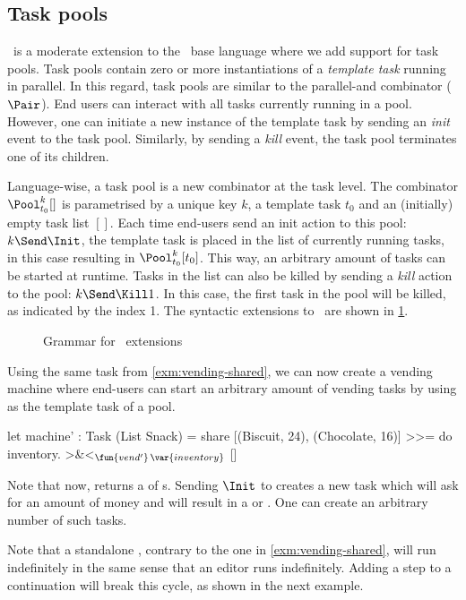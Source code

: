 \subsection{Task pools}

\DYNTOPHAT\ is a moderate extension to the \TOPHAT\ base language where we add support for task pools.
Task pools contain zero or more instantiations of a \emph{template task} running in parallel.
In this regard, task pools are similar to the parallel-and combinator ($\Pair$).
End users can interact with all tasks currently running in a pool.
However, one can initiate a new instance of the template task by sending an \emph{init} event to the task pool.
Similarly, by sending a \emph{kill} event, the task pool terminates one of its children.

Language-wise, a task pool is a new combinator at the task level.
The combinator $\Pool^k_{t_0} []$ is parametrised by a unique key $k$, a template task $t_0$ and an (initially) empty task list $[]$.
Each time end-users send an init action to this pool: $k\Send\Init$, the template task is placed in the list of currently running tasks,
in this case resulting in $\Pool^k_{t_0} [t_0]$.
This way, an arbitrary amount of tasks can be started at runtime.
Tasks in the list can also be killed by sending a \emph{kill} action to the pool: $k\Send\Kill1$.
In this case, the first task in the pool will be killed, as indicated by the index 1.
The syntactic extensions to \TOPHAT\ are shown in \cref{fig:dynamic-grammar}.

\begin{figure}
  \caption{Grammar for \DYNTOPHAT\ extensions}
  \label{fig:dynamic-grammar}
\end{figure}

\begin{example}
  \label{exm:vending-dynamic}
  Using the same  task from \cref{exm:vending-shared},
  we can now create a vending machine where end-users can start an arbitrary amount of vending tasks
  by using  as the template task of a pool.
  \begin{TASK}[emph={inventory}]
    let machine' : Task (List Snack) =
      share [(Biscuit, 24), (Chocolate, 16)] >>= do inventory.
      >&<$_{\fun{vend'}\,\var{inventory}}$ []
  \end{TASK}
  Note that now,  returns a  of s.
  Sending $\Init$ to  creates a new  task
  which will ask for an amount of money and will result in a  or .
  One can create an arbitrary number of such tasks.

  Note that a standalone , contrary to the one in \cref{exm:vending-shared}, will run indefinitely
  in the same sense that an editor runs indefinitely.
  Adding a step to a continuation will break this cycle,
  as shown in the next example.
\end{example}

